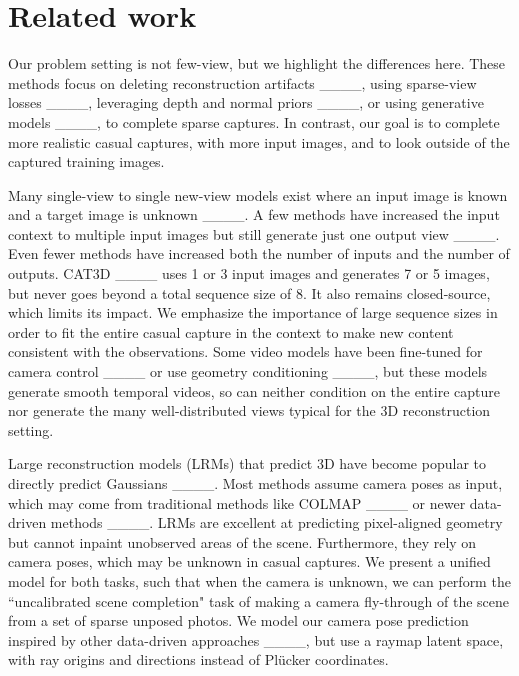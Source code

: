 \section{Related work}
\label{sec:related_work}
\vspace{-0.5em}

Our problem setting is not few-view, but we highlight the differences here.
These methods focus on deleting reconstruction artifacts ____, using sparse-view losses ____, leveraging depth and normal priors ____, or using generative models ____, to complete sparse captures.
In contrast, our goal is to complete more realistic casual captures, with more input images, and to look outside of the captured training images.

Many single-view to single new-view models exist where an input image is known and a target image is unknown ____.
A few methods have increased the input context to multiple input images but still generate just one output view ____.
Even fewer methods have increased both the number of inputs and the number of outputs.
CAT3D ____ uses 1 or 3 input images and generates 7 or 5 images, but never goes beyond a total sequence size of 8.
It also remains closed-source, which limits its impact.
We emphasize the importance of large sequence sizes in order to fit the entire casual capture in the context to make new content consistent with the observations.
Some video models have been fine-tuned for camera control ____ or use geometry conditioning ____, but these models generate smooth temporal videos, so can neither condition on the entire capture nor generate the many well-distributed views typical for the 3D reconstruction setting.

Large reconstruction models (LRMs) that predict 3D have become popular to directly predict Gaussians ____.
Most methods assume camera poses as input, which may come from traditional methods like COLMAP ____ or newer data-driven methods ____.
LRMs are excellent at predicting pixel-aligned geometry but cannot inpaint unobserved areas of the scene.
Furthermore, they rely on camera poses, which may be unknown in casual captures.
We present a unified model for both tasks, such that when the camera is unknown, we can perform the ``uncalibrated scene completion" task of making a camera fly-through of the scene from a set of sparse unposed photos.
We model our camera pose prediction inspired by other data-driven approaches ____, but use a raymap latent space, with ray origins and directions instead of Plücker coordinates.

